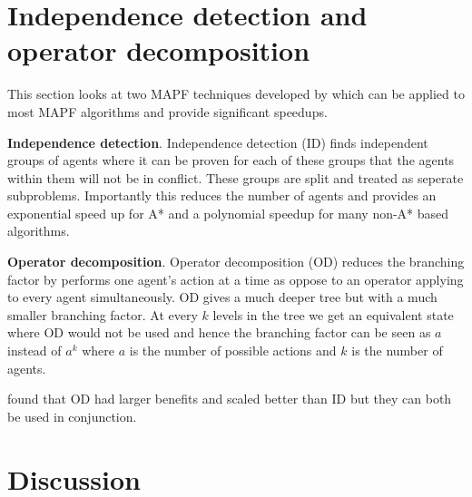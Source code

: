 \documentclass[a4paper,11pt]{article}
\begin{document}
\section{Independence detection and operator decomposition} \label{sec:generalimprovements}
This section looks at two MAPF techniques developed by \cite{standley2010finding} which can be applied to most MAPF algorithms and provide significant speedups.

\noindent \textbf{Independence detection}. Independence detection (ID) finds independent groups of agents where it can be proven for each of these groups that the agents within them will not be in conflict. These groups are split and treated as seperate subproblems. Importantly this reduces the number of agents and provides an exponential speed up for A* and a polynomial speedup for many non-A* based algorithms.

\noindent \textbf{Operator decomposition}. Operator decomposition (OD) reduces the branching factor by performs one agent's action at a time as oppose to an operator applying to every agent simultaneously. OD gives a much deeper tree but with a much smaller branching factor. At every $k$ levels in the tree we get an equivalent state where OD would not be used and hence the branching factor can be seen as $a$ instead of $a^k$ where $a$ is the number of possible actions and $k$ is the number of agents.

\cite{standley2010finding} found that OD had larger benefits and scaled better than ID but they can both be used in conjunction.

\newpage

\section{Discussion} \label{sec:discussion}
\end{document}

